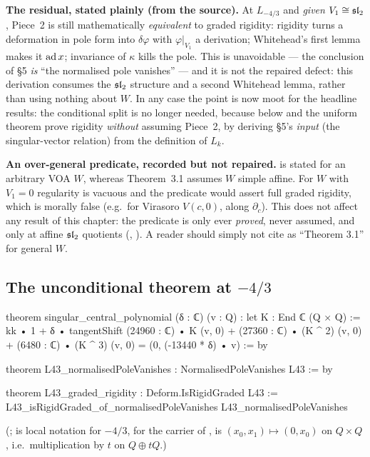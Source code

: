 \begin{warning}
\textbf{The residual, stated plainly (from the source).} At $L_{-4/3}$ and \emph{given}
$V_1\cong\mathfrak{sl}_2$, Piece~2 is still mathematically \emph{equivalent} to graded rigidity: rigidity turns
a deformation in pole form into $\delta\varphi$ with $\varphi|_{V_1}$ a derivation; Whitehead's first lemma
makes it $\operatorname{ad} x$; invariance of $\kappa$ kills the pole. This is unavoidable --- the conclusion of
\S5 \emph{is} ``the normalised pole vanishes'' --- and it is not the repaired defect: this
derivation consumes the $\mathfrak{sl}_2$ structure and a second Whitehead lemma, rather than using nothing
about $W$. In any case the point is now moot for the headline results: the conditional split is no
longer needed, because  below and the uniform theorem prove rigidity
\emph{without} assuming Piece~2, by deriving \S5's \emph{input} (the singular-vector relation) from
the definition of $L_k$.
\end{warning}

\begin{warning}
\textbf{An over-general predicate, recorded but not repaired.} 
is stated for an arbitrary VOA $W$, whereas Theorem~3.1 assumes $W$ simple affine. For $W$ with
$V_1 = 0$ regularity is vacuous and the predicate would assert full graded rigidity, which is
morally false (e.g.\ for Virasoro $V(c,0)$, along $\partial_c$). This does not affect any result of this
chapter: the predicate is only ever \emph{proved}, never assumed, and only at affine $\mathfrak{sl}_2$
quotients (, ). A
reader should simply not cite  as ``Theorem 3.1'' for general $W$.
\end{warning}

\subsection{The unconditional theorem at \texorpdfstring{$-4/3$}{-4/3}}

\begin{leancode}
theorem singular_central_polynomial (δ : ℂ) (v : Q) :
    let K : End ℂ (Q × Q) := kk • 1 + δ • tangentShift
    (24960 : ℂ) • K (v, 0) + (27360 : ℂ) • (K ^ 2) (v, 0) +
      (6480 : ℂ) • (K ^ 3) (v, 0) = (0, (-13440 * δ) • v) := by
\end{leancode}
\begin{leancode}
theorem L43_normalisedPoleVanishes : NormalisedPoleVanishes L43 := by
\end{leancode}
\begin{leancode}
theorem L43_graded_rigidity : Deform.IsRigidGraded L43 :=
  L43_isRigidGraded_of_normalisedPoleVanishes L43_normalisedPoleVanishes
\end{leancode}
(;  is local notation for $-4/3$,
 for the carrier of ,  is $(x_0,x_1)\mapsto(0,x_0)$ on $Q\times Q$, i.e.\
multiplication by $t$ on $Q\oplus tQ$.)

